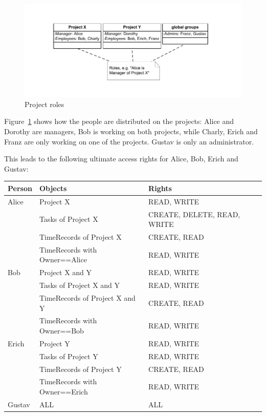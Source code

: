 \begin{figure}[ht]
	\begin{center}
		\includegraphics{images/Roles.pdf}
		\caption{Project roles}
		\label{project_roles}
	\end{center}
\end{figure}

Figure~\ref{project_roles} shows how the people are distributed on the projects:
Alice and Dorothy are managers, Bob is working on both projects, while Charly,
Erich and Franz are only working on one of the projects. Gustav is only an
administrator.

This leads to the following ultimate access rights for Alice, Bob, Erich and
Gustav:

\begin{tabular}{l|lp{3.9cm}}
Person & Objects & Rights \\
\hline
Alice & Project X & READ, WRITE \\
	& Tasks of Project X & CREATE, DELETE, READ, WRITE \\
	& TimeRecords of Project X & CREATE, READ \\
	& TimeRecords with Owner==Alice & READ, WRITE \\
\hline
Bob & Project X and Y & READ, WRITE \\
	& Tasks of Project X and Y & READ, WRITE \\
	& TimeRecords of Project X and Y & CREATE, READ \\
	& TimeRecords with Owner==Bob & READ, WRITE \\
\hline
Erich & Project Y & READ, WRITE \\
	& Tasks of Project Y & READ, WRITE \\
	& TimeRecords of Project Y & CREATE, READ \\
	& TimeRecords with Owner==Erich & READ, WRITE \\
\hline
Gustav & ALL & ALL \\

\end{tabular}
